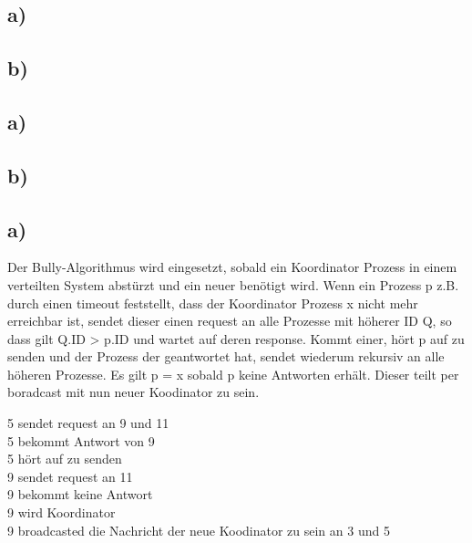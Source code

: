 \documentclass[ngerman]{fbi-aufgabenblatt}
\begin{document}
	\setcounter{section}{0}

	
	\subsection*{a)}

	\subsection*{b)}

    
	
	\subsection*{a)}

	\subsection*{b)}	
	
	\subsection*{a)}
	Der Bully-Algorithmus wird eingesetzt, sobald ein Koordinator Prozess in einem verteilten System abstürzt und ein neuer benötigt wird.
	Wenn ein Prozess p z.B. durch einen timeout feststellt, dass der Koordinator Prozess x nicht mehr erreichbar ist, sendet dieser einen request an alle Prozesse mit höherer ID Q, so dass gilt Q.ID > p.ID und wartet auf deren response. Kommt einer, hört p auf zu senden und der Prozess der geantwortet hat, sendet wiederum rekursiv an alle höheren Prozesse. Es gilt p = x sobald p keine Antworten erhält. Dieser teilt per boradcast mit nun neuer Koodinator zu sein.

	5 sendet request an 9 und 11\\
	5 bekommt Antwort von 9\\
	5 hört auf zu senden\\
	9 sendet request an 11\\
	9 bekommt keine Antwort\\
	9 wird Koordinator\\
	9 broadcasted die Nachricht der neue Koodinator zu sein an 3 und 5 	
		
	
\end{document}
